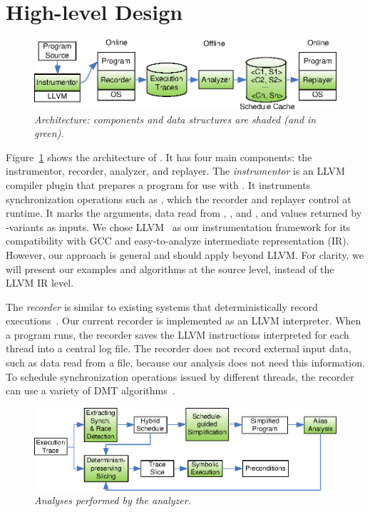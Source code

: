 \section{High-level Design} \label{sec:peregrine-design}

\begin{figure}[t]
\centering
\includegraphics[width=.7\columnwidth]{peregrine/figures/overview.eps}
\caption{{\em \peregrine Architecture: components and data structures are
    shaded (and in green).}}\label{fig:peregrine-arch}
\end{figure}


Figure~\ref{fig:peregrine-arch} shows the architecture of \peregrine.  It has four main
components: the instrumentor, recorder, analyzer, and
replayer.  The \emph{instrumentor} is an LLVM~\cite{llvm} compiler plugin
that prepares a program for use with \peregrine.  It instruments synchronization
operations such as , which the recorder and
replayer control at runtime.  It marks the  arguments, data read
from , , and , and values
returned by -variants as
inputs.  We chose LLVM~\cite{llvm} as our instrumentation framework for
its compatibility with GCC and easy-to-analyze intermediate representation
(IR).  However, our approach is general and should apply beyond LLVM.
For clarity, we will present our examples and algorithms at the
source level, instead of the LLVM IR level.

The \emph{recorder} is similar to existing systems that deterministically
record executions~\cite{scribe:sigmetrics10,idna:vee06,smp-revirt:vee08}.
Our current recorder is implemented as an LLVM interpreter.  When a
program runs, the recorder saves the LLVM instructions interpreted for
each thread into a central log file.  The recorder does not record
external input data, such as data read from a file, because our
analysis does not need this information.  To schedule synchronization
operations issued by different threads, the recorder can use a variety of
DMT algorithms~\cite{cui:tern:osdi10}.  


\begin{figure}
\centering
\includegraphics[width=0.7\columnwidth]{peregrine/figures/analyzer.eps}
\caption{{\em Analyses performed by the analyzer.}}\label{fig:peregrine-analyzer}
\end{figure}

